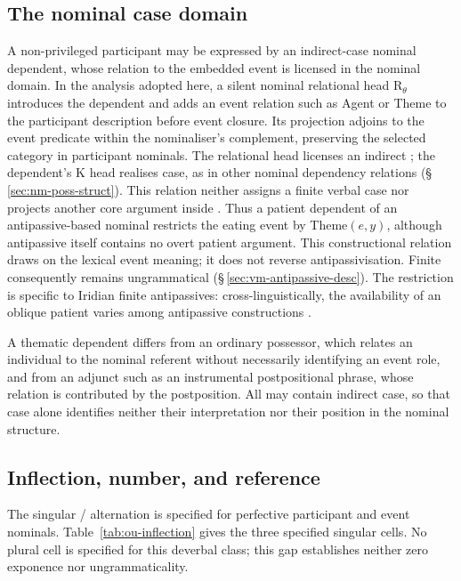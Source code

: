\subsection{The nominal case domain}
A non-privileged participant may be expressed by an indirect-case nominal
dependent, whose relation to the embedded event is licensed in the nominal
domain. In the analysis adopted here, a silent nominal relational head
$\mathrm{R}_{\theta}$ introduces the dependent and adds an event relation
such as Agent or Theme to the participant description before event closure.
Its projection adjoins to the event predicate within the nominaliser's
complement, preserving the selected  category in participant
nominals. The relational head licenses an indirect ; the
dependent's K head realises case, as in other nominal dependency relations
(§\,\ref{sec:nm-poss-struct}). This relation neither assigns a finite verbal
case nor projects another core argument inside . Thus a patient
dependent of an antipassive-based nominal
restricts the eating event by Theme$(e,y)$, although antipassive
 itself contains no overt patient argument. This constructional
relation draws on the lexical event meaning; it does not reverse
antipassivisation. Finite  consequently remains
ungrammatical (§\,\ref{sec:vm-antipassive-desc}). The restriction is specific
to Iridian finite antipassives: cross-linguistically, the availability of an
oblique patient varies among antipassive constructions \cite{heaton2020}.

A thematic dependent differs from an ordinary possessor, which relates an
individual to the nominal referent without necessarily identifying an event
role, and from an adjunct such as an instrumental postpositional phrase,
whose relation is contributed by the postposition. All may contain indirect
case, so that case alone identifies neither their interpretation nor their
position in the nominal structure.

\subsection{Inflection, number, and reference}
\label{sec:nm-derived-inflection}

The singular / alternation is specified for perfective
participant and event nominals. Table~\ref{tab:ou-inflection} gives the
three specified singular cells. No plural cell is specified for this
deverbal class; this gap establishes neither zero exponence nor ungrammaticality.

